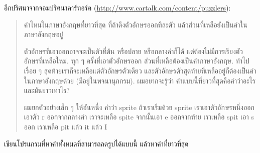 \begin{exercise}


อีกปริศนาจากจอมปริศนาคาร์ทอร์ค
(\url{http://www.cartalk.com/content/puzzlers}):

\begin{quote}

คำไหนในภาษาอังกฤษที่ยาวที่สุด ที่ถ้าดึงตัวอักษรออกทีละตัว แล้วส่วนที่เหลือยังเป็นคำในภาษาอังกฤษอยู่


ตัวอักษรที่เอาออกอาจจะเป็นตัวที่ต้น หรือปลาย หรือกลางคำก็ได้
แต่ต้องไม่มีการเรียงตัวอักษรที่เหลือใหม่.
ทุก ๆ ครั้งที่เอาตัวอักษรออก ส่วนที่เหลือต้องเป็นคำภาษาอังกฤษ.
ทำไปเรื่อย ๆ สุดท้ายเราก็จะเหลือแต่ตัวอักษรตัวเดียว และตัวอักษรตัวสุดท้ายที่เหลืออยู่ก็ต้องเป็นคำในภาษาอังกฤษด้วย (มีอยู่ในพจนานุกกรม).
ผมอยากจะรู้ว่า คำแบบนี้ที่ยาวที่สุดคือคำว่าอะไร และมันยาวเท่าไร?


ผมยกตัวอย่างเล็ก ๆ ให้อันหนึ่ง คำว่า sprite
ถ้าเราเริ่มด้วย sprite เราเอาตัวอักษรหนึ่งออก เอาตัว r ออกจากกลางคำ
เราจะเหลือ spite
จากนั้นเอา e ออกจากท้าย เราเหลือ spit
เอา s ออก เราเหลือ pit แล้ว it แล้ว I
 

\end{quote}

เขียนโปรแกรมที่หาคำทั้งหมดที่สามารถลดรูปได้แบบนี้ แล้วหาคำที่ยาวที่สุด



\end{exercise}
